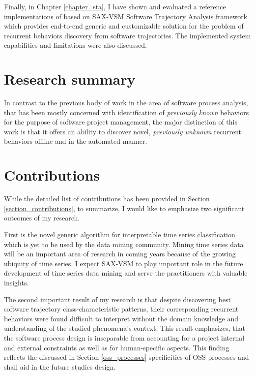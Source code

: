 Finally, in Chapter \ref{chapter_sta}, I have shown and evaluated a reference implementations of based on SAX-VSM Software Trajectory Analysis framework which provides end-to-end generic and customizable solution for the problem of recurrent behaviors discovery from software trajectories. The implemented system capabilities and limitations were also discussed.

\section{Research summary}
In contrast to the previous body of work in the area of software process analysis, that has been mostly concerned with identification of \textit{previously known} behaviors for the purpose of software project management, the major distinction of this work is that it offers an ability to discover novel, \textit{previously unknown} recurrent behaviors offline and in the automated manner.

\section{Contributions}
While the detailed list of contributions has been provided in Section \ref{section_contributions}, to summarize, I would like to emphasize two significant outcomes of my research.

First is the novel generic algorithm for interpretable time series classification which is yet to be used by the data mining community. Mining time series data will be an important area of research in coming years because of the growing ubiquity of time series. I expect SAX-VSM to play important role in the future development of time series data mining and serve the practitioners with valuable insights.

The second important result of my research is that despite discovering best software trajectory class-characteristic patterns, their corresponding recurrent behaviors were found difficult to interpret without the domain knowledge and understanding of the studied phenomena's context. This result emphasizes, that the software process design is inseparable from accounting for a project internal and external constraints as well as for human-specific aspects. This finding reflects the discussed in Section \ref{oss_processes} specificities of OSS processes and shall aid in the future studies design.

